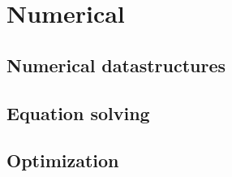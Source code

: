 
\chapter{Numerical}

\section{Numerical datastructures}

\section{Equation solving}

\section{Optimization}

